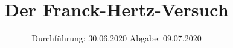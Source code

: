 

\subject{V601}
\title{Der Franck-Hertz-Versuch}
\date{%
  Durchführung: 30.06.2020
  \hspace{3em}
  Abgabe: 09.07.2020
}



\maketitle
\thispagestyle{empty}
\tableofcontents
\newpage








\printbibliography{}


